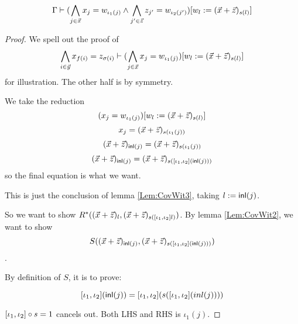 \begin{lemma}\label{Lem:CovWit4}
  \begin{equation*}
    \Gamma \vdash (\bigwedge_{j\in\vec{x}}x_j = w_{\iota_1(j)}\land \bigwedge_{j'\in\vec{z}}z_{j'}= w_{\iota_2(j')}) [w_l:=(\vec{x}+\vec{z})_{s(l)}]
  \end{equation*}
\end{lemma}

\begin{proof}
  We spell out the proof of 
  \begin{equation*}
    \bigwedge_{i\in \vec{y}} x_{f(i)} = z_{\sigma(i)} \vdash 
     (\bigwedge_{j\in\vec{x}}x_j = w_{\iota_1(j)}) [w_l:=(\vec{x}+\vec{z})_{s(l)}] 
   \end{equation*}
   for illustration. The other half is by symmetry.

  We take the reduction
\[(x_j = w_{\iota_1(j)}) [w_l:=(\vec{x}+\vec{z})_{s(l)}]\]
\[x_j = (\vec{x}+\vec{z})_{s(\iota_1(j))}\]
\[(\vec{x}+\vec{z})_{\mathsf{inl}(j)} = (\vec{x}+\vec{z})_{s(\iota_1(j))}\]
\[(\vec{x}+\vec{z})_{\mathsf{inl}(j)} = (\vec{x}+\vec{z})_{s([\iota_1,\iota_2] (\mathsf{inl}(j)))}\]
so the final equation is what we want.

This is just the conclusion of lemma \ref{Lem:CovWit3}, taking $l := \mathsf{inl}(j)$.

So we want to show $R^*((\vec{x}+\vec{z})_l,(\vec{x}+\vec{z})_{s([\iota_1,\iota_2] l)})$. By lemma \ref{Lem:CovWit2}, we want to show \[S((\vec{x}+\vec{z})_{\mathsf{inl}(j)},(\vec{x}+\vec{z})_{s([\iota_1,\iota_2] (\mathsf{inl}(j)))})\].

By definition of $S$, it is to prove:

\[[\iota_1,\iota_2] (\mathsf{inl}(j)) = [\iota_1,\iota_2] (s([\iota_1,\iota_2] (inl(j)))) \]

$[\iota_1,\iota_2]\circ s = 1$ cancels out. Both LHS and RHS is $\iota_1(j)$.

\end{proof}



